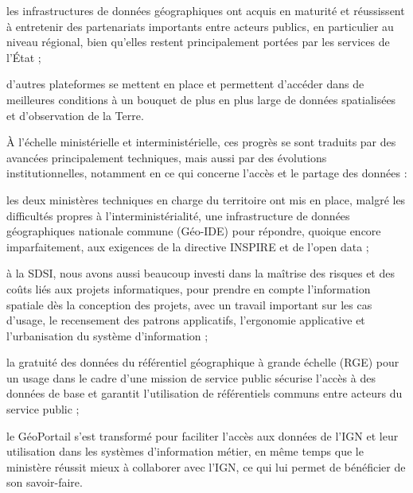 \startitemize

\item les infrastructures de données géographiques ont acquis en maturité et
réussissent à entretenir des partenariats importants entre acteurs publics, en
particulier au niveau régional, bien qu'elles restent principalement portées
par les services de l'État ;

\item d'autres plateformes se mettent en place et permettent d'accéder dans de
meilleures conditions à un bouquet de plus en plus large de données
spatialisées et d'observation de la Terre.

\stopitemize

À l'échelle ministérielle et interministérielle, ces progrès se sont traduits
par des avancées principalement techniques, mais aussi par des évolutions
institutionnelles, notamment en ce qui concerne l'accès et le partage des
données :

\startitemize

\item les deux ministères techniques en charge du territoire ont mis en place,
malgré les difficultés propres à l’interministérialité, une infrastructure de
données géographiques nationale commune (Géo-IDE) pour répondre, quoique
encore imparfaitement, aux exigences de la directive INSPIRE et de l'open data ;

\item à la SDSI, nous avons aussi beaucoup investi dans la maîtrise des risques et
des coûts liés aux projets informatiques, pour prendre en compte l'information
spatiale dès la conception des projets, avec un travail important sur les cas
d'usage, le recensement des patrons applicatifs, l'ergonomie applicative et
l'urbanisation du système d'information ;

\item la gratuité des données du référentiel géographique à grande échelle (RGE)
pour un usage dans le cadre d'une mission de service public sécurise l'accès à
des données de base et garantit l'utilisation de référentiels communs entre
acteurs du service public ;

\item le GéoPortail s'est transformé pour faciliter l'accès aux données de l'IGN et
leur utilisation dans les systèmes d'information métier, en même temps que le
ministère réussit mieux à collaborer avec l'IGN, ce qui lui permet de
bénéficier de son savoir-faire.

\stopitemize

